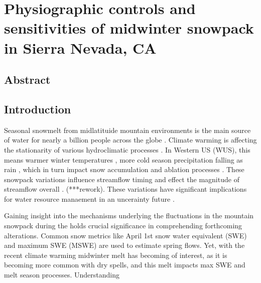 \hypertarget{ch2}{%
\chapter{Physiographic controls and sensitivities of midwinter snowpack in Sierra Nevada, CA}\label{ch2}}

\hypertarget{ch2-abstract}{\section{Abstract}\label{ch2-abstract}}

\hypertarget{ch2-intro}{\section{Introduction}\label{ch2-intro}}

Seasonal snowmelt from midlatituide mountain environments is the main source of water for nearly a billion people across the globe \citep{sturmWaterLifeSnow2017}.
Climate warming is affecting the stationarity of various hydroclimatic processes \citep{millyStationarityDeadWhither2008}. In Western US (WUS), this means warmer winter temperatures \cite{gergelEffectsClimateChange2017}, more cold season precipitation falling as rain \citep{knowlesTrendsSnowfallRainfall2006}, which in turn impact snow accumulation and ablation processes \citep{kapnickCausesRecentChanges2012}. These snowpack variations influence streamflow timing \citep{stewartChangesSnowmeltRunoff2004} and effect the magnitude of streamflow overall \citep{barnhartSnowmeltRateDictates2016}. (***rework). These variations have significant implications for water resource manaement in an uncerainty future \citep{livnehDroughtLessPredictable2020}.

Gaining insight into the mechanisms underlying the fluctuations in the mountain snowpack during the holds crucial significance in comprehending forthcoming alterations. Common snow metrics like April 1st snow water equivalent (SWE) and maximum SWE (MSWE) are used to estimate spring flows. Yet, with the recent climate warming midwinter melt has becoming of interest, as it is becoming more common with dry spells, and this melt impacts max SWE and melt season processes. Understanding 




